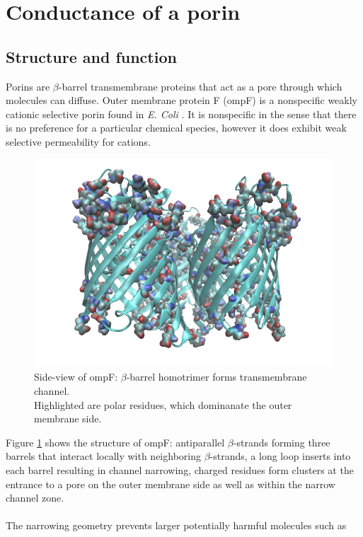 \documentclass{article}[12pt]
\numberwithin{equation}{section}
\begin{document}
\section{Conductance of a porin}
\vspace{-5pt}
\subsection{Structure and function}
Porins are $\beta$-barrel transmembrane proteins that act as a pore through
which molecules can diffuse. Outer membrane protein F (ompF) is a nonspecific
weakly cationic selective porin found in \textit{E. Coli} \cite{Novikova2009}.
It is nonspecific in the sense that there is no preference for a particular
chemical species, however it does exhibit weak selective permeability for
cations.
\begin{figure}[H]
	\centering{}
	\captionsetup{justification=centering}
	\includegraphics[scale=0.4]{ompf}
\caption{Side-view of ompF: $\beta$-barrel homotrimer forms transmembrane channel.\\
Highlighted are polar residues, which dominanate the outer membrane side.}
\label{fig:ompF}
\end{figure}\noindent
Figure \ref{fig:ompF} shows the structure of ompF: antiparallel $\beta$-strands
forming three barrels that interact locally with neighboring $\beta$-strands, a
long loop inserts into each barrel resulting in channel narrowing, charged
residues form clusters at the entrance to a pore on the outer membrane side as
well as within the narrow channel zone.
\\\\
The narrowing geometry prevents larger potentially harmful molecules such as
\end{document}

